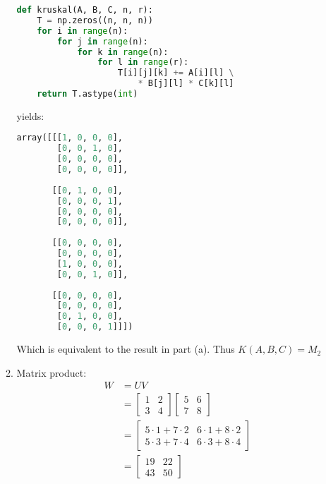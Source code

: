 \documentclass[11pt,a4paper]{article}
\begin{document}
\begin{enumerate}
\begin{enumerate}
\begin{lstlisting}[language=Python]
def kruskal(A, B, C, n, r):
    T = np.zeros((n, n, n))
    for i in range(n):
        for j in range(n):
            for k in range(n):
                for l in range(r):
                    T[i][j][k] += A[i][l] \
                        * B[j][l] * C[k][l]
    return T.astype(int)
                    \end{lstlisting}
                    yields:

                    \begin{lstlisting}[language=Python]
array([[[1, 0, 0, 0],
        [0, 0, 1, 0],
        [0, 0, 0, 0],
        [0, 0, 0, 0]],
            
       [[0, 1, 0, 0],
        [0, 0, 0, 1],
        [0, 0, 0, 0],
        [0, 0, 0, 0]],
            
       [[0, 0, 0, 0],
        [0, 0, 0, 0],
        [1, 0, 0, 0],
        [0, 0, 1, 0]],
            
       [[0, 0, 0, 0],
        [0, 0, 0, 0],
        [0, 1, 0, 0],
        [0, 0, 0, 1]]])
                \end{lstlisting}
                    Which is equivalent to the result in part (a). Thus $K(A, B, C) = M_2$


              \item Matrix product:
                    \begin{align*}
                        W & = UV                                            \\
                          & = \begin{bmatrix}
                                  1 & 2 \\ 3 & 4
                              \end{bmatrix} \begin{bmatrix}
                                                5 & 6 \\ 7 & 8
                                            \end{bmatrix}                  \\
                          & = \begin{bmatrix}
                                  5 \cdot 1 + 7 \cdot 2 & 6 \cdot 1 + 8 \cdot 2 \\
                                  5 \cdot 3 + 7 \cdot 4 & 6 \cdot 3 + 8 \cdot 4
                              \end{bmatrix} \\
                          & = \begin{bmatrix}
                                  19 & 22 \\ 43 & 50
                              \end{bmatrix}
                    \end{align*}


\end{enumerate}
\end{enumerate}
\end{document}
